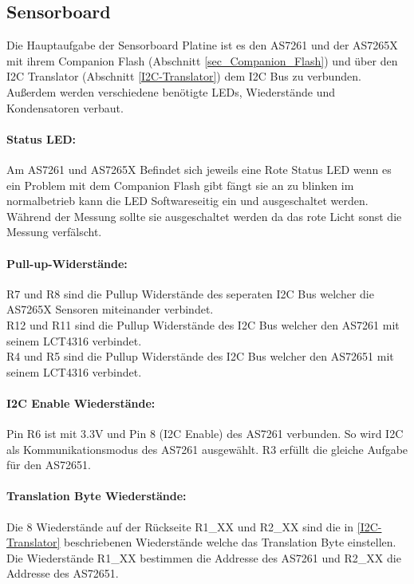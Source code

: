 \subsection{Sensorboard}
Die Hauptaufgabe der Sensorboard Platine ist es den AS7261 und der AS7265X mit ihrem Companion Flash (Abschnitt \ref{sec_Companion_Flash}) und über den I2C Translator (Abschnitt \ref{I2C-Translator}) dem I2C Bus zu verbunden.
Außerdem werden verschiedene benötigte LEDs, Wiederstände und Kondensatoren verbaut.


\paragraph{Status LED:} Am AS7261 und AS7265X Befindet sich je­weils eine Rote Status LED wenn es ein Problem mit dem Companion Flash gibt fängt sie an zu blinken im normalbetrieb kann die LED Softwareseitig ein und ausgeschaltet werden.
	Während der Messung sollte sie ausgeschaltet werden da das rote Licht sonst die Messung verfälscht.

\paragraph{Pull-up-Widerstände:}
R7 und R8 sind die Pullup Widerstände des seperaten I2C Bus welcher die AS7265X Sensoren miteinander verbindet.\\
R12 und R11 sind die Pullup Widerstände des I2C Bus welcher den AS7261 mit seinem LCT4316 verbindet.\\
R4 und R5 sind die Pullup Widerstände des I2C Bus welcher den AS72651 mit seinem LCT4316 verbindet.

\paragraph{I2C Enable Wiederstände:} Pin R6 ist mit 3.3V und Pin 8 (I2C Enable) des AS7261 verbunden. So wird 
I2C als Kommunikationsmodus des AS7261 ausgewählt.
	R3 erfüllt die gleiche Aufgabe für den AS72651.
	
\paragraph{Translation Byte Wiederstände:}
Die 8 Wiederstände auf der Rückseite R1\_XX und R2\_XX sind die in \ref{I2C-Translator} beschriebenen Wiederstände welche das Translation Byte einstellen. Die Wiederstände R1\_XX bestimmen die Addresse des AS7261 und R2\_XX die Addresse des AS72651.

